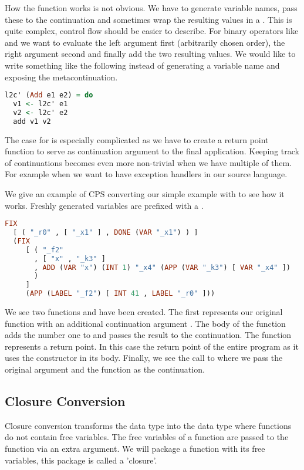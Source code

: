 {How the  function works is not obvious. We have to generate variable names, pass these to the continuation and sometimes wrap the resulting values in a . This is quite complex, control flow should be easier to describe. For binary operators like  and  we want to evaluate the left argument first (arbitrarily chosen order), the right argument second and finally add the two resulting values. We would like to write something like the following instead of generating a variable name and exposing the metacontinuation.

\begin{lstlisting}[language=Haskell]
l2c' (Add e1 e2) = do
  v1 <- l2c' e1
  v2 <- l2c' e2
  add v1 v2
\end{lstlisting}

The case for  is especially complicated as we have to create a return point function to serve as continuation argument to the final application. Keeping track of continuations becomes even more non-trivial when we have multiple of them. For example when we want to have exception handlers in our source language.

We give an example of CPS converting our simple example with  to see how it works. Freshly generated variables are prefixed with a \icode{_}.

\begin{lstlisting}[language=Haskell]
FIX
  [ ( "_r0" , [ "_x1" ] , DONE (VAR "_x1") ) ]
  (FIX
     [ ( "_f2"
       , [ "x" , "_k3" ]
       , ADD (VAR "x") (INT 1) "_x4" (APP (VAR "_k3") [ VAR "_x4" ])
       )
     ]
     (APP (LABEL "_f2") [ INT 41 , LABEL "_r0" ]))
\end{lstlisting}

We see two functions  and  have been created. The first represents our original function with an additional continuation argument . The body of the function adds the number one to  and passes the result to the continuation. The  function represents a return point. In this case the return point of the entire program as it uses the  constructor in its body. Finally, we see the call to  where we pass the original argument and the  function as the continuation.

\subsection{\label{section:closconvert}Closure Conversion}
Closure conversion transforms the  data type into the  data type where functions do not contain free variables. The free variables of a function are passed to the function via an extra argument. We will package a function with its free variables, this package is called a 'closure'.

}
